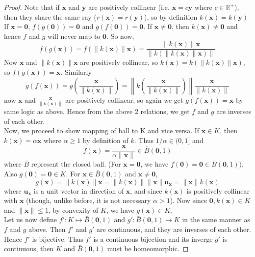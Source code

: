 \documentclass{article}
\theoremstyle{definition}
\begin{document}
\begin{proof}
Note that if $\mathbf{x}$ and $\mathbf{y}$ are positively collinear (i.e. $\mathbf{x} = c\mathbf{y}$ where $c\in \mathbb{R}^+$), then they share the same ray ($r(\mathbf{x})= r(\mathbf{y})$), so by definition $k(\mathbf{x})= k(\mathbf{y})$\\

If $\mathbf{x} = \mathbf{0}$, $f(g(\mathbf{0})) = \mathbf{0}$ and $g(f(\mathbf{0})) = \mathbf{0}$. If $\mathbf{x} \neq \mathbf{0}$, then $k(\mathbf{x})\neq \mathbf{0}$ and hence $f$ and $g$ will never map to $\mathbf{0}$. So now, $$f(g(\mathbf{x})) = f(\|k(\mathbf{x})\|\mathbf{x}) = \frac{\|k(\mathbf{x})\|\mathbf{x}}{\|k(\|k(\mathbf{x})\|\mathbf{x})\|}$$
Now $\mathbf{x}$ and $\|k(\mathbf{x})\|\mathbf{x}$ are positively collinear, so $k(\mathbf{x}) = k(\|k(\mathbf{x})\|\mathbf{x})$, so $f(g(\mathbf{x})) = \mathbf{x}$. Similarly $$g(f(\mathbf{x})) = g\left(\frac{\mathbf{x}}{\|k(\mathbf{x})\|}\right) = \left\| k\left(\frac{\mathbf{x}}{\|k(\mathbf{x})\|}\right)\right\|\frac{\mathbf{x}}{\|k(\mathbf{x})\|}$$ now $\mathbf{x}$ and $\frac{\mathbf{x}}{\|k(\mathbf{x})\|}$ are positively collinear, so again we get $g(f(\mathbf{x}))  = \mathbf{x}$ by same logic as above. Hence from the above 2 relations, we get $f$ and $g$ are inverses of each other.\\

Now, we proceed to show mapping of ball to K and vice versa. If $\mathbf{x}\in K$, then $k(\mathbf{x}) = \alpha \mathbf{x}$ where $\alpha \geq 1$ by definition of $k$. Thus $1/\alpha \in (0,1]$ and $$f(\mathbf{x}) = \frac{\mathbf{x}}{\alpha\|\mathbf{x}\|} \in \bar{B}(\mathbf{0},1)$$ where $\bar{B}$ represent the closed ball. (For $\mathbf{x} = \mathbf{0}$, we have $f(\mathbf{0}) = \mathbf{0} \in \bar{B}(\mathbf{0},1))$.\\
Also $g(\mathbf{0}) = \mathbf{0}\in K$. For $\mathbf{x}\in \bar{B}(\mathbf{0},1)$ and $\mathbf{x} \neq \mathbf{0}$, $$g(\mathbf{x}) = \|k(\mathbf{x})\|\mathbf{x} = \|k(\mathbf{x})\|\|\mathbf{x}\|\mathbf{u_x} = \|\mathbf{x}\|k(\mathbf{x})$$
where $\mathbf{u_x}$ is a unit vector in direction of $\mathbf{x}$, and since $k(\mathbf{x})$ is positively collinear with $\mathbf{x}$ (though, unlike before, it is not necessary $\alpha>1$). Now since $\mathbf{0}, k(\mathbf{x}) \in K$ and $\|\mathbf{x}\| \leq 1$, by convexity of $K$, we have $g(\mathbf{x})\in K$.\\
Let us now define $f':K \mapsto \bar{B}(\mathbf{0},1)$ and $g':\bar{B}(\mathbf{0},1) \mapsto K$ in the same manner as $f$ and $g$ above. Then $f'$ and $g'$ are continuous, and they are inverses of each other. Hence $f'$ is bijective. Thus $f'$ is a continuous bijection and its inverge $g'$ is continuous, then $K$ and $\bar{B}(\mathbf{0},1)$ must be homeomorphic.
\end{proof}
\end{document}

